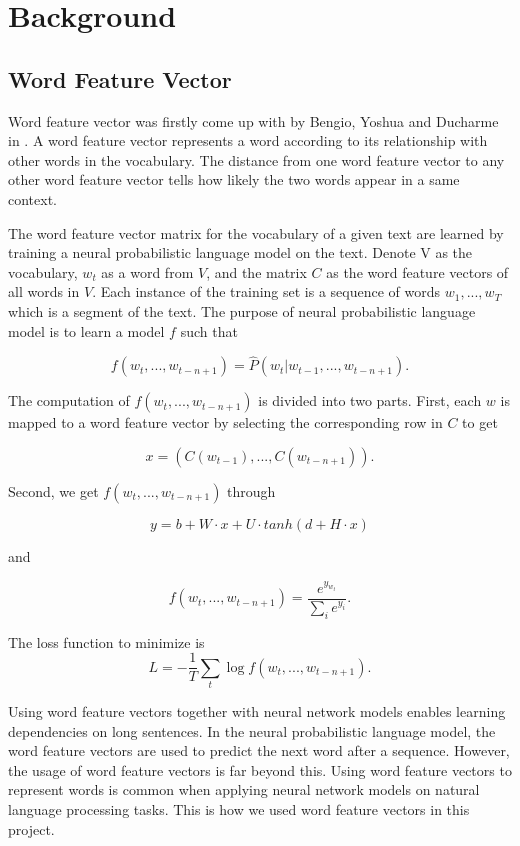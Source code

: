 \documentclass[modernstyle,12pt]{sjsuthesis}
\theoremstyle{definition}
\begin{document}
\chapter{Background}\label{chap:background}
\section{Word Feature Vector}

Word feature vector was firstly come up with by Bengio, Yoshua and Ducharme in \cite{bengio2003neural}. A word feature vector represents a word according to its relationship with other words in the vocabulary. The distance from one word feature vector to any other word feature vector tells how likely the two words appear in a same context.

The word feature vector matrix for the vocabulary of a given text are learned by training a neural probabilistic language model on the text. Denote V as the vocabulary, $w_t$ as a word from $V$, and the matrix $C$ as the word feature vectors of all words in $V$. Each instance of the training set is a sequence of words $w_1,...,w_T$ which is a segment of the text. The purpose of neural probabilistic language model is to learn a model $f$ such that

$$ f(w_t, ..., w_{t-n+1}) = \hat{P}(w_t | w_{t-1},...,w_{t-n+1}).$$

The computation of $f(w_t, ..., w_{t-n+1})$ is divided into two parts.
First, each $w$ is mapped to a word feature vector by selecting the corresponding row in $C$ to get

$$x=(C(w_{t-1}),... ,C(w_{t-n+1})).$$

Second, we get $f(w_t, ..., w_{t-n+1})$ through

$$y=b+W\cdot x + U\cdot tanh(d + H\cdot x)$$

and

$$ f(w_t, ..., w_{t-n+1}) = \frac{e^{y_{w_t}}}{\sum_{i}^{}e^{y_i}}.$$

The loss function to minimize is $$L = -\frac{1}{T}\sum _{t}^{} \log{f(w_t, ..., w_{t-n+1})}.$$


Using word feature vectors together with neural network models enables learning dependencies on long sentences. In the neural probabilistic language model, the word feature vectors are used to predict the next word after a sequence. However, the usage of word feature vectors is far beyond this. Using word feature vectors to represent words is common when applying neural network models on natural language processing tasks. This is how we used word feature vectors in this project.
\end{document}
